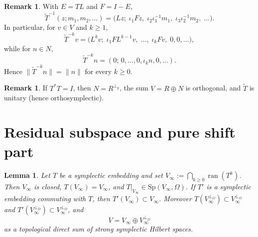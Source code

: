 \documentclass[11pt,a4paper]{article}
\newtheorem{lemma}[theorem]{Lemma}
\theoremstyle{definition}
\newtheorem{remark}[theorem]{Remark}
\begin{document}
\begin{remark}
\label{rem:inverse}
With \(E=TL\) and \(F=I-E\),
\[
\widetilde{T}^{-1}(z;m_1,m_2,\dots)
=\bigl(Lz;\;\iota_1 Fz,\;\iota_2\iota_1^{-1}m_1,\;\iota_3\iota_2^{-1}m_2,\;\dots\bigr).
\]
In particular, for \(v\in V\) and \(k\ge 1\),
\begin{equation}
\label{eq:neg}
\widetilde{T}^{-k}v
=\bigl(L^kv;\;\iota_1 FL^{k-1}v,\;\dots,\;\iota_k Fv,\;0,0,\dots\bigr),
\end{equation}
while for \(n\in N\),
\begin{equation}
\label{eq:negN}
\widetilde{T}^{-k}n=(0;\,0,\dots,0,\iota_k n,0,\dots).
\end{equation}
Hence \(\|\widetilde{T}^{-k}n\|=\|n\|\) for every \(k\ge 0\).
\end{remark}

\begin{remark}
\label{rem:unitary}
If \(T^*T=I\), then \(N=R^{\perp_g}\), the sum \(V=R\oplus N\) is orthogonal, and
\(\widetilde{T}\) is unitary (hence orthosymplectic).
\end{remark}

\section{Residual subspace and pure shift part}

\begin{lemma}
\label{lem:residual}
Let \(T\) be a symplectic embedding and set \(V_\infty:=\bigcap_{k\ge 0}\operatorname{ran}(T^k)\).
Then \(V_\infty\) is closed, \(T(V_\infty)=V_\infty\), and \(T|_{V_\infty}\in\mathrm{Sp}(V_\infty,\Omega)\).
If \(T'\) is a symplectic embedding commuting with \(T\), then \(T'(V_\infty)\subset V_\infty\).
Moreover \(T(V_\infty^{\perp_\Omega})\subset V_\infty^{\perp_\Omega}\) and
\(T'(V_\infty^{\perp_\Omega})\subset V_\infty^{\perp_\Omega}\), and
\begin{equation}
\label{eq:split}
V=V_\infty\oplus V_\infty^{\perp_\Omega}
\end{equation}
as a topological direct sum of strong symplectic Hilbert spaces.
\end{lemma}
\end{document}
